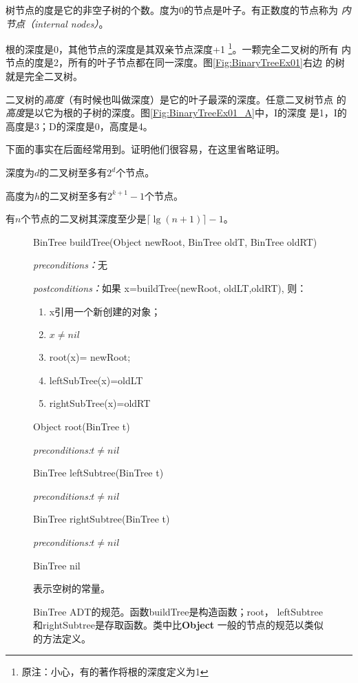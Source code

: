 树节点的度是它的非空子树的个数。度为0的节点是叶子。有正数度的节点称为
\emph{内节点（internal nodes）}。

根的深度是0，其他节点的深度是其双亲节点深度+1
\footnote{原注：小心，有的著作将根的深度定义为1}。一颗完全二叉树的所有
内节点的度是2，所有的叶子节点都在同一深度。图\ref{Fig:BinaryTreeEx01}右边
的树就是完全二叉树。

二叉树的\emph{高度}（有时候也叫做深度）是它的叶子最深的深度。任意二叉树节点
的\emph{高度}是以它为根的子树的深度。图\ref{Fig:BinaryTreeEx01_A}中，I的深度
是1，I的高度是3；D的深度是0，高度是4。

下面的事实在后面经常用到。证明他们很容易，在这里省略证明。

\begin{lemma}
深度为$d$的二叉树至多有$2^d$个节点。
\end{lemma}

\begin{lemma}
高度为$h$的二叉树至多有$2^{k+1}-1$个节点。
\end{lemma}

\begin{lemma}
有$n$个节点的二叉树其深度至少是$\lceil\lg(n+1)\rceil-1$。
\end{lemma}

\begin{figure*}[!t]
\colorbox[rgb]{0.9, 0.9, 0.9}{BinTree buildTree(Object newRoot, BinTree oldT, BinTree oldRT)}

\emph{preconditions：}无

\emph{postconditions：}如果 x=buildTree(newRoot, oldLT,oldRT), 则：
\begin{enumerate}
\item x引用一个新创建的对象；
\item $x\neq nil$
\item root(x)= newRoot;
\item leftSubTree(x)=oldLT
\item rightSubTree(x)=oldRT
\end{enumerate}

\colorbox[rgb]{0.9, 0.9, 0.9}{Object  root(BinTree t)}

\emph{preconditions:}$t \neq nil$

\colorbox[rgb]{0.9, 0.9, 0.9}{BinTree  leftSubtree(BinTree t)}

\emph{preconditions:}$t \neq nil$

\colorbox[rgb]{0.9, 0.9, 0.9}{BinTree  rightSubtree(BinTree t)}

\emph{preconditions:}$t \neq nil$

\colorbox[rgb]{0.9, 0.9, 0.9}{BinTree  nil}

表示空树的常量。

    \caption{BinTree ADT的规范。函数buildTree是构造函数；root，
            leftSubtree和rightSubtree是存取函数。类中比\textbf{Object}
            一般的节点的规范以类似的方法定义。}
    \label{Fig:BinaryTreeSpecification}
\end{figure*}

